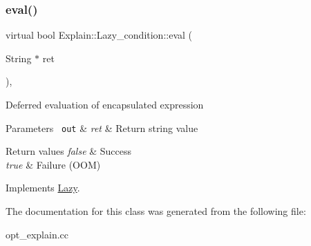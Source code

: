\subsubsection{\texorpdfstring{eval()}{eval()}}
{\footnotesize\ttfamily virtual bool Explain\+::\+Lazy\+\_\+condition\+::eval (\begin{DoxyParamCaption}\item[{String $\ast$}]{ret }\end{DoxyParamCaption})\hspace{0.3cm}{\ttfamily [inline]}, {\ttfamily [virtual]}}

Deferred evaluation of encapsulated expression


\begin{DoxyParams}[1]{Parameters}
\mbox{\texttt{ out}}  & {\em ret} & Return string value\\
\hline
\end{DoxyParams}

\begin{DoxyRetVals}{Return values}
{\em false} & Success \\
\hline
{\em true} & Failure (O\+OM) \\
\hline
\end{DoxyRetVals}


Implements \mbox{\hyperlink{classLazy_ac3fda1792b722409e31ee1d73bde3595}{Lazy}}.



The documentation for this class was generated from the following file\+:\begin{DoxyCompactItemize}
\item 
opt\+\_\+explain.\+cc\end{DoxyCompactItemize}
